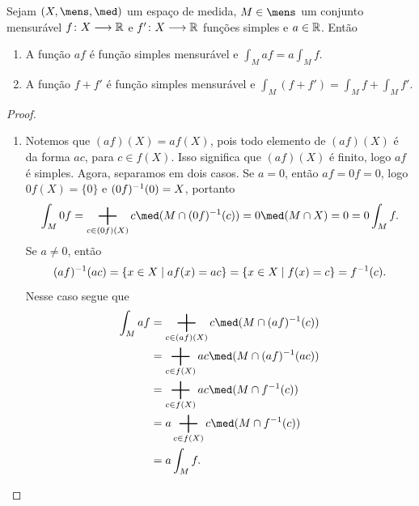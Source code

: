 \begin{prop}
Sejam $(X,\mens,\med)$ um espaço de medida, $M \in \mens$ um conjunto mensurável $f\colon X \longrightarrow \mathbb{R}$ e $f'\colon X \longrightarrow \mathbb{R}$ funções simples e $a \in \mathbb{R}$. Então
	\begin{enumerate}
	\item A função $af$ é função simples mensurável e $\displaystyle\int_M af = a\int_M f$.
	\item A função $f+f'$ é função simples mensurável e $\displaystyle\int_M (f+f') = \int_M f + \int_M f'$.
	\end{enumerate}
\end{prop}
\begin{proof}
\begin{enumerate}
	\item Notemos que $(af)(X) = af(X)$, pois todo elemento de $(af)(X)$ é da forma $ac$, para $c \in f(X)$. Isso significa que $(af)(X)$ é finito, logo $af$ é simples. Agora, separamos em dois casos. Se $a=0$, então $af=0f=0$, logo $0f(X)=\{0\}$ e $(0f)^{-1}(0)=X$, portanto
	\begin{equation*}
	\int_M 0f = \sum_{c \in (0f)(X)} c \med(M \cap (0f)\inv(c)) = 0 \med(M \cap X) = 0 = 0\int_M f.
	\end{equation*}
Se $a \neq 0$, então
	\begin{equation*}
	(af)^{-1}(ac) = \left\{x \in X \;\middle\vert\; af(x)=ac \right\} = \left\{x \in X \;\middle\vert\; f(x)=c \right\} = f^{-1}(c).
	\end{equation*}
	Nesse caso segue que
	\begin{align*}
	\int_M af &= \sum_{c \in (af)(X)} c \med(M \cap (af)\inv(c)) \\
		&= \sum_{c \in f(X)} ac \med(M \cap (af)\inv(ac)) \\
		&= \sum_{c \in f(X)} ac \med(M \cap f\inv(c)) \\
		&= a\sum_{c \in f(X)} c \med(M \cap f\inv(c)) \\
		&= a\int_M f.
	\end{align*}


\end{enumerate}
\end{proof}
